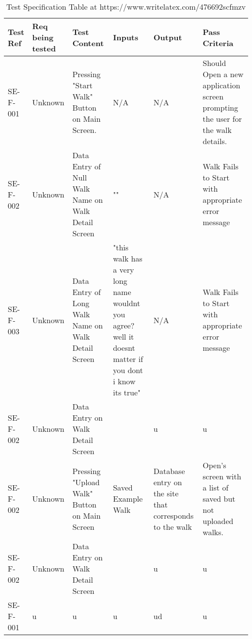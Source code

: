 \documentclass{article}
\begin{document}
\begin{table}
\begin{tabular}{| l | l | p{2cm} | p{2cm} | p{2cm} | p{2cm} |} 
\toprule
Test Ref & Req being tested & Test Content & Inputs & Output & Pass Criteria\\ \midrule


SE-F-001 & Unknown & Pressing "Start Walk" Button on Main Screen. & N/A & N/A  &  Should Open a new application screen prompting the user for the walk details. \\ \midrule

SE-F-002 & Unknown & Data Entry of Null Walk Name on Walk Detail Screen  & "" & N/A & Walk Fails to Start with appropriate error message\\ \midrule

SE-F-003 & Unknown & Data Entry of Long Walk Name on Walk Detail Screen  & "this walk has a very long name wouldnt you agree? well it doesnt matter if you dont i know its true" & N/A & Walk Fails to Start with appropriate error message\\ \midrule


SE-F-002 & Unknown & Data Entry on Walk Detail Screen  &  & u &  u \\ \midrule


SE-F-002 & Unknown & Pressing "Upload Walk" Button on Main Screen & Saved Example Walk & Database entry on the site that corresponds to the walk & Open's screen with a list of saved but not uploaded walks. \\ \midrule

SE-F-002 & Unknown & Data Entry on Walk Detail Screen  &  & u &  u \\
SE-F-001 & u & u & u & ud &  u \\




\end{tabular}
\caption{Test Specification Table at https://www.writelatex.com/476692scfmzv}
\label{tab:Tests}
\end{table}
\end{document}
